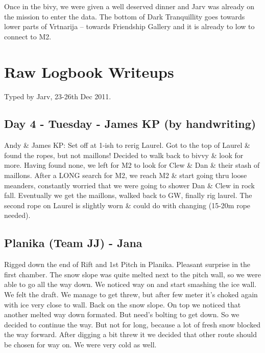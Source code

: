 Once in the bivy, we were given a well deserved dinner and Jarv was
already on the mission to enter the data. The bottom of Dark
Tranquillity goes towards lower parts of Vrtnarija -- towards Friendship
Gallery and it is already to low to connect to M2.


\section{Raw Logbook Writeups}\label{raw-logbook-writeups}

Typed by Jarv, 23-26th Dec 2011.

\subsection{Day 4 - Tuesday - James KP (by
handwriting)}\label{day-4---tuesday---james-kp-by-handwriting}

Andy \& James KP: Set off at 1-ish to rerig Laurel. Got to the top of
Laurel \& found the ropes, but not maillons! Decided to walk back to
bivvy \& look for more. Having found none, we left for M2 to look for
Clew \& Dan \& their stash of maillons. After a LONG search for M2, we
reach M2 \& start going thru loose meanders, constantly worried that we
were going to shower Dan \& Clew in rock fall. Eventually we get the
maillons, walked back to GW, finally rig laurel. The second rope on
Laurel is slightly worn \& could do with changing (15-20m rope needed).

\subsection{Planika (Team JJ) - Jana}\label{planika-team-jj---jana}

Rigged down the end of Rift and 1st Pitch in Planika. Pleasant surprise
in the first chamber. The snow slope was quite melted next to the pitch
wall, so we were able to go all the way down. We noticed way on and
start smashing the ice wall. We felt the draft. We manage to get threw,
but after few meter it's choked again with ice very close to wall. Back
on the snow slope. On top we noticed that another melted way down
formated. But need's bolting to get down. So we decided to continue the
way. But not for long, because a lot of fresh snow blocked the way
forward. After digging a bit threw it we decided that other route should
be chosen for way on. We were very cold as well.

